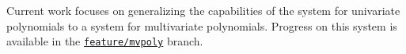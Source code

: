 \label{sec:multivariate}

Current work focuses on generalizing the capabilities of the system for univariate polynomials to a system for multivariate polynomials. Progress on this system is available in the \href{https://github.com/LiamSchilling/AutomatePolynomial/tree/feature/mvpoly}{\texttt{feature/mvpoly}} branch.

\newpage

